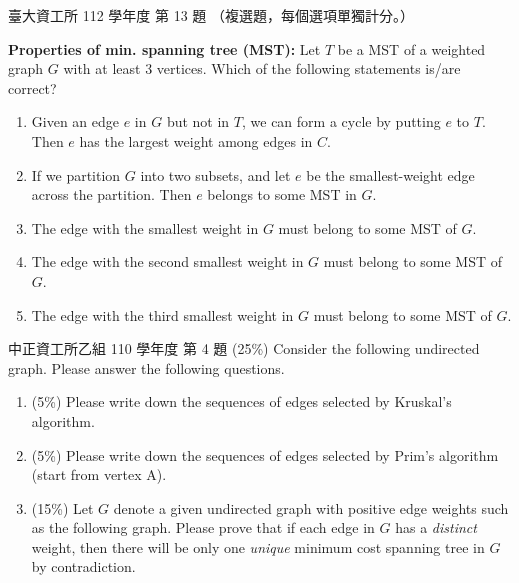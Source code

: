 \begin{pastexam}[label={px:mst-2}]{臺大資工所 112 學年度 第 13 題}
（複選題，每個選項單獨計分。）

\textbf{Properties of min. spanning tree (MST):} Let $T$ be a MST of a weighted graph $G$ with at
least 3 vertices. Which of the following statements is/are correct?
\begin{enumerate}[label=(\Alph*)]
\item Given an edge $e$ in $G$ but not in $T$, we can form a cycle by putting $e$ to $T$. Then
$e$ has the largest weight among edges in $C$.
\item If we partition $G$ into two subsets, and let $e$ be the smallest-weight edge across the
partition. Then $e$ belongs to some MST in $G$.
\item The edge with the smallest weight in $G$ must belong to some MST of $G$.
\item The edge with the second smallest weight in $G$ must belong to some MST of $G$.
\item The edge with the third smallest weight in $G$ must belong to some MST of $G$.
\end{enumerate}
\end{pastexam}

\begin{pastexam}[label={px:mst-3}]{中正資工所乙組 110 學年度 第 4 題}
(25\%) Consider the following undirected graph. Please answer the following questions.
\begin{enumerate}[label=(\alph*)]
\item (5\%) Please write down the sequences of edges selected by Kruskal's algorithm.
\item (5\%) Please write down the sequences of edges selected by Prim's algorithm (start from
vertex A).
\item (15\%) Let $G$ denote a given undirected graph with positive edge weights such as the
following graph. Please prove that if each edge in $G$ has a \emph{distinct} weight, then there
will be only one \emph{unique} minimum cost spanning tree in $G$ by contradiction.
\end{enumerate}

\begin{center}
\end{center}
\end{pastexam}

